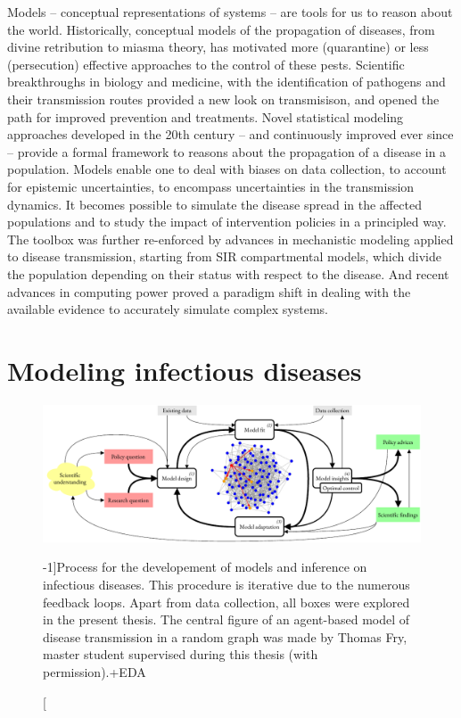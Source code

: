 Models -- conceptual representations of systems -- are tools for us to reason about the world. Historically, conceptual models of the propagation of diseases, from divine retribution to miasma theory, has motivated more (quarantine) or less (persecution) effective approaches to the control of these pests. Scientific breakthroughs in biology and medicine, with the identification of pathogens and their transmission routes provided a new look on transmisison, and opened the path for improved prevention and treatments. Novel statistical modeling approaches\cite[-3\baselineskip]{Freedman:AssociationCausationRemarks:1999} developed in the 20th century -- and continuously improved ever since\cite{Gelman:WhatAreMost:2021} --  provide a formal framework to reasons about the propagation of a disease in a population. Models enable one to deal with biases on data collection, to account for epistemic uncertainties, to encompass uncertainties in the transmission dynamics. It becomes possible to simulate the disease spread in the affected populations and to study the impact of intervention policies in a principled way. The toolbox was further re-enforced by advances in mechanistic modeling applied to disease transmission, starting from SIR compartmental models\cite{Kermack:ContributionMathematicalTheory:1927, Anderson:PopulationBiologyInfectious:1979}, which divide the population depending on their status with respect to the disease. And recent advances in computing power proved a paradigm shift in dealing with the available evidence to accurately simulate complex systems.



\section{Modeling infectious diseases}
 \begin{figure}\centering
  \includegraphics{fig/modeling_cycle}
  \caption[Process for infectious disease modeling][-1\baselineskip]{Process for the developement of models and inference on infectious diseases. This procedure is iterative due to the numerous feedback loops. Apart from data collection, all boxes were explored in the present thesis. The central figure of an agent-based model of disease transmission in a random graph was made by Thomas Fry,  master student supervised during this thesis (with permission).+EDA}\label{fig:modeling}
\end{figure}

